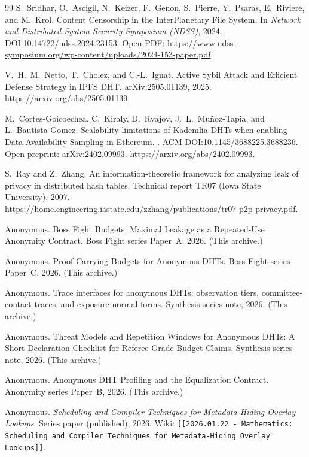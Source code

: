 \documentclass[11pt]{article}
\begin{document}
\begin{thebibliography}{99}
S.~Sridhar, O.~Ascigil, N.~Keizer, F.~Genon, S.~Pierre, Y.~Psaras, E.~Riviere, and M.~Krol.
\newblock Content Censorship in the InterPlanetary File System.
\newblock In \emph{Network and Distributed System Security Symposium (NDSS)}, 2024.
\newblock DOI:10.14722/ndss.2024.23153.
\newblock Open PDF: \url{https://www.ndss-symposium.org/wp-content/uploads/2024-153-paper.pdf}.

V.~H.~M.~Netto, T.~Cholez, and C.-L.~Ignat.
\newblock Active Sybil Attack and Efficient Defense Strategy in IPFS DHT.
\newblock arXiv:2505.01139, 2025. \url{https://arxiv.org/abs/2505.01139}.

M.~Cortes-Goicoechea, C.~Kiraly, D.~Ryajov, J.~L.~Mu\~noz-Tapia, and L.~Bautista-Gomez.
\newblock Scalability limitations of Kademlia DHTs when enabling Data Availability Sampling in Ethereum.
.
\newblock ACM DOI:10.1145/3688225.3688236. Open preprint: arXiv:2402.09993. \url{https://arxiv.org/abs/2402.09993}.

S.~Ray and Z.~Zhang.
\newblock An information-theoretic framework for analyzing leak of privacy in distributed hash tables.
\newblock Technical report TR07 (Iowa State University), 2007. \url{https://home.engineering.iastate.edu/zzhang/publications/tr07-p2p-privacy.pdf}.

Anonymous.
\newblock Boss Fight Budgets: Maximal Leakage as a Repeated-Use Anonymity Contract.
\newblock Boss Fight series Paper~A, 2026. (This archive.)

Anonymous.
\newblock Proof-Carrying Budgets for Anonymous DHTs.
\newblock Boss Fight series Paper~C, 2026. (This archive.)


Anonymous.
\newblock Trace interfaces for anonymous DHTs: observation tiers, committee-contact traces, and exposure normal forms.
\newblock Synthesis series note, 2026. (This archive.)

Anonymous.
\newblock Threat Models and Repetition Windows for Anonymous DHTs: A Short Declaration Checklist for Referee-Grade Budget Claims.
\newblock Synthesis series note, 2026. (This archive.)

Anonymous.
\newblock Anonymous DHT Profiling and the Equalization Contract.
\newblock Anonymity series Paper~B, 2026. (This archive.)


Anonymous.
\newblock \emph{Scheduling and Compiler Techniques for Metadata-Hiding Overlay Lookups}.
\newblock Series paper (published), 2026.
\newblock Wiki: \texttt{[[2026.01.22 - Mathematics: Scheduling and Compiler Techniques for Metadata-Hiding Overlay Lookups]]}.



\end{thebibliography}
\end{document}

